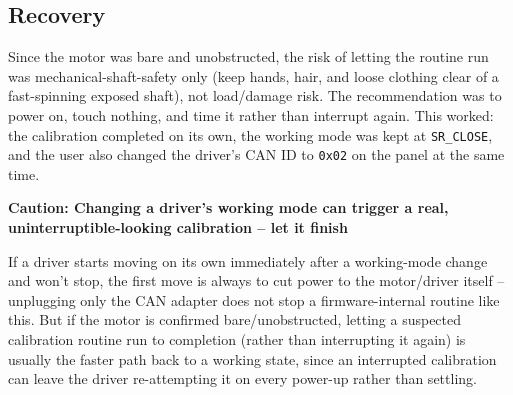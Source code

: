 \documentclass[11pt,letterpaper]{article}
\newenvironment{caution}[1]{%
    \par\addvspace{8pt}%
    \noindent{\color{cautionred}\rule{\linewidth}{0.8pt}}\par\vspace{2pt}
    \noindent\textbf{\color{cautionred}Caution: #1}\par\vspace{2pt}
}{%
    \par\vspace{2pt}\noindent{\color{cautionred}\rule{\linewidth}{0.4pt}}%
    \par\addvspace{8pt}%
}
\begin{document}
\subsection{Recovery}
Since the motor was bare and unobstructed, the risk of letting the routine run was mechanical-shaft-safety only (keep hands, hair, and loose clothing clear of a fast-spinning exposed shaft), not load/damage risk. The recommendation was to power on, touch nothing, and time it rather than interrupt again. This worked: the calibration completed on its own, the working mode was kept at \texttt{SR\_CLOSE}, and the user also changed the driver's CAN ID to \texttt{0x02} on the panel at the same time.

\begin{caution}{Changing a driver's working mode can trigger a real, uninterruptible-looking calibration -- let it finish}
If a driver starts moving on its own immediately after a working-mode change and won't stop, the first move is always to cut power to the motor/driver itself -- unplugging only the CAN adapter does not stop a firmware-internal routine like this. But if the motor is confirmed bare/unobstructed, letting a suspected calibration routine run to completion (rather than interrupting it again) is usually the faster path back to a working state, since an interrupted calibration can leave the driver re-attempting it on every power-up rather than settling.
\end{caution}
\end{document}
